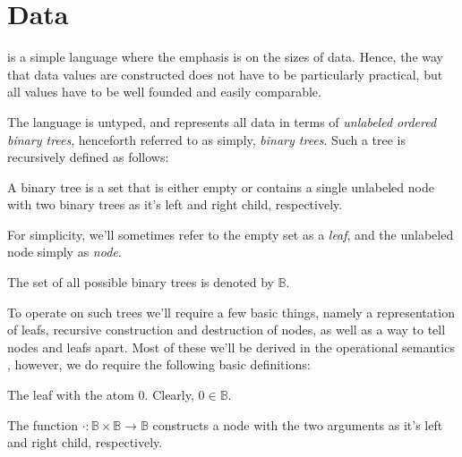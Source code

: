 \section{Data}

\D{} is a simple language where the emphasis is on the sizes of data. Hence,
the way that data values are constructed does not have to be particularly
practical, but all values have to be well founded and easily comparable.

The language \D{} is untyped, and represents all data in terms of
\emph{unlabeled ordered binary trees}, henceforth referred to as simply,
\emph{binary trees}. Such a tree is recursively defined as follows:

\begin{definition}

A binary tree is a set that is either empty or contains a single unlabeled node
with two binary trees as it's left and right child, respectively.

\end{definition}

For simplicity, we'll sometimes refer to the empty set as a \emph{leaf}, and
the unlabeled node simply as \emph{node}.

\begin{definition}

The set of all possible binary trees is denoted by $\mathbb{B}$.

\end{definition}

To operate on such trees we'll require a few basic things, namely a
representation of leafs, recursive construction and destruction of nodes, as
well as a way to tell nodes and leafs apart. Most of these we'll be derived in
the operational semantics , however, we do require the
following basic definitions:

\begin{definition}

The leaf with the atom $0$. Clearly, $0\in\mathbb{B}$.

\end{definition}

\begin{definition}

The function $\cdot
:\mathbb{B}\times\mathbb{B}\rightarrow\mathbb{B}$ constructs a node with the
two arguments as it's left and right child, respectively. 

\end{definition}

